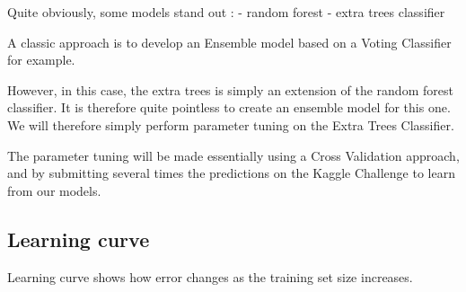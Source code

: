 \documentclass[11pt]{article}
\begin{document}
    Quite obviously, some models stand out : - random forest - extra trees
classifier

A classic approach is to develop an Ensemble model based on a Voting
Classifier for example.

However, in this case, the extra trees is simply an extension of the
random forest classifier. It is therefore quite pointless to create an
ensemble model for this one. We will therefore simply perform parameter
tuning on the Extra Trees Classifier.

The parameter tuning will be made essentially using a Cross Validation
approach, and by submitting several times the predictions on the Kaggle
Challenge to learn from our models.

    \subsection{Learning curve}\label{learning-curve}

    Learning curve shows how error changes as the training set size
increases.
\end{document}
